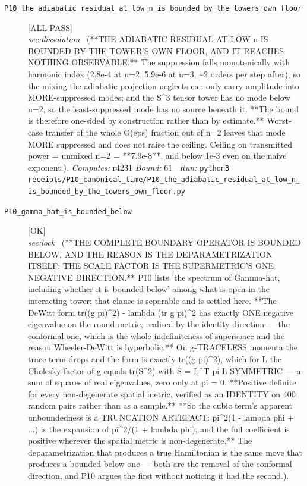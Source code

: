 \begin{description}
\item[\label{rcpt:P10_the_adiabatic_residual_at_low_n_is_bounded_by_the_towers_own_floor}\texttt{P10\_the\_adiabatic\_residual\_at\_low\_n\_is\_bounded\_by\_the\_towers\_own\_floor}]\hfill\textsf{[ALL PASS]}\\
\textit{sec:dissolution} \ (**THE ADIABATIC RESIDUAL AT LOW n IS BOUNDED BY THE TOWER'S OWN FLOOR, AND IT REACHES NOTHING OBSERVABLE.** The suppression falls monotonically with harmonic index (2.8e-4 at n=2, 5.9e-6 at n=3, \textasciitilde{}2 orders per step after), so the mixing the adiabatic projection neglects can only carry amplitude into MORE-suppressed modes; and the S\textasciicircum{}3 tensor tower has no mode below n=2, so the least-suppressed mode has no source beneath it. **The bound is therefore one-sided by construction rather than by estimate.** Worst-case transfer of the whole O(eps) fraction out of n=2 leaves that mode MORE suppressed and does not raise the ceiling. Ceiling on transmitted power = unmixed n=2 = **7.9e-8**, and below 1e-3 even on the naive exponent.). 
\emph{Computes:} r4231
 \emph{Bound:} 61
\ \emph{Run:} \texttt{python3 receipts/P10\_canonical\_time/P10\_the\_adiabatic\_residual\_at\_low\_n\_is\_bounded\_by\_the\_towers\_own\_floor.py}
\item[\label{rcpt:P10_gamma_hat_is_bounded_below}\texttt{P10\_gamma\_hat\_is\_bounded\_below}]\hfill\textsf{[OK]}\\
\textit{sec:lock} \ (**THE COMPLETE BOUNDARY OPERATOR IS BOUNDED BELOW, AND THE REASON IS THE DEPARAMETRIZATION ITSELF: THE SCALE FACTOR IS THE SUPERMETRIC'S ONE NEGATIVE DIRECTION.** P10 lists 'the spectrum of Gamma-hat, including whether it is bounded below' among what is open in the interacting tower; that clause is separable and is settled here. **The DeWitt form tr((g pi)\textasciicircum{}2) - lambda (tr g pi)\textasciicircum{}2 has exactly ONE negative eigenvalue on the round metric, realised by the identity direction --- the conformal one, which is the whole indefiniteness of superspace and the reason Wheeler-DeWitt is hyperbolic.** On g-TRACELESS momenta the trace term drops and the form is exactly tr((g pi)\textasciicircum{}2), which for L the Cholesky factor of g equals tr(S\textasciicircum{}2) with S = L\textasciicircum{}T pi L SYMMETRIC --- a sum of squares of real eigenvalues, zero only at pi = 0. **Positive definite for every non-degenerate spatial metric, verified as an IDENTITY on 400 random pairs rather than as a sample.** **So the cubic term's apparent unboundedness is a TRUNCATION ARTEFACT: pi\textasciicircum{}2(1 - lambda phi + ...) is the expansion of pi\textasciicircum{}2/(1 + lambda phi), and the full coefficient is positive wherever the spatial metric is non-degenerate.** The deparametrization that produces a true Hamiltonian is the same move that produces a bounded-below one --- both are the removal of the conformal direction, and P10 argues the first without noticing it had the second.). 

\end{description}
